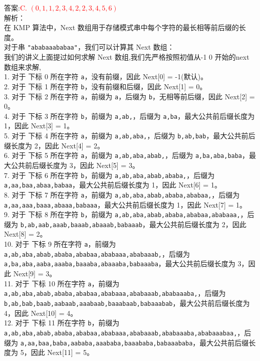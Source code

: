 \documentclass[lang=cn,newtx,10pt,scheme=chinese]{../../../elegantbook}
\begin{document}
\begin{enumerate}
    答案:\textcolor{red}{C. $(0, 1, 1, 2, 3, 4, 2, 2, 3,4,5,6)$}\\
    解析：\\
    在 KMP 算法中，Next 数组用于存储模式串中每个字符的最长相等前后缀的长度。\\
    对于串 \texttt{"ababaaababaa"}，我们可以计算其 Next 数组：\\
    我们的讲义上面提过如何求解 Next 数组,我们先严格按照初值从-1 0 开始的next 数组来求解,\\
    1. 对于 下标 0 所在字符 \texttt{a}，没有前缀，因此 Next[0] = -1(默认)。\\
    2. 对于 下标 1 所在字符 \texttt{b}，没有前缀和后缀，因此 Next[1] = 0。\\
    3. 对于 下标 2 所在字符 \texttt{a}，前缀为 \texttt{a}，后缀为 \texttt{b}，无相等前后缀，因此 Next[2] = 0。\\
    4. 对于 下标 3 所在字符 \texttt{b}，前缀为 \texttt{a,ab,}，后缀为 \texttt{a,ba}，最大公共前后缀长度为 1，因此 Next[3] = 1。\\
    5. 对于 下标 4 所在字符 \texttt{a}，前缀为 \texttt{a,ab,aba,}，后缀为 \texttt{b,ab,bab}，最大公共前后缀长度为 2，因此 Next[4] = 2。\\
    6. 对于 下标 5 所在字符 \texttt{a}，前缀为 \texttt{a,ab,aba,abab,}，后缀为 \texttt{a,ba,aba,baba}，最大公共前后缀长度为 3，因此 Next[5] = 3。\\
    7. 对于 下标 6 所在字符 \texttt{b}，前缀为 \texttt{a,ab,aba,abab,ababa,}，后缀为 \texttt{a,aa,baa,abaa,babaa}，最大公共前后缀长度为 1，因此 Next[6] = 1。\\
    8. 对于 下标 7 所在字符 \texttt{a}，前缀为 \texttt{a,ab,aba,abab,ababa,ababaa,}，后缀为 \texttt{a,aa,aaa,baaa,abaaa,babaaa}，最大公共前后缀长度为 1，因此 Next[7] = 1。\\
    9. 对于 下标 8 所在字符 \texttt{b}，前缀为 \texttt{a,ab,aba,abab,ababa,ababaa,ababaaa,}，后缀为 \texttt{b,ab,aab,aaab,baaab,abaaab,babaaab}，最大公共前后缀长度为 2，因此 Next[8] = 2。\\
    10. 对于 下标 9 所在字符 \texttt{a}，前缀为 \texttt{a,ab,aba,abab,ababa,ababaa,ababaaa,ababaaab,}，后缀为 \texttt{a,ba,aba,aaba,aaaba,baaaba,abaaaba,babaaaba}，最大公共前后缀长度为 3，因此 Next[9] = 3。\\
    11. 对于 下标 10 所在字符 \texttt{a}，前缀为 \texttt{a,ab,aba,abab,ababa,ababaa,ababaaa,ababaaab,ababaaaba,}，后缀为 \texttt{b,ab,bab,baab,aabaab,aaabaab,baaabaab,babaaabab}，最大公共前后缀长度为 4，因此 Next[10] = 4。\\
    12. 对于 下标 11 所在字符 \texttt{b}，前缀为 \texttt{a,ab,aba,abab,ababa,ababaa,ababaaa,ababaaab,ababaaaba,ababaaabaa,}，后缀为 \texttt{a,aa,baa,baba,aababa,aaababa,baaababa,babaaababa}，最大公共前后缀长度为 5，因此 Next[11] = 5。\\


\end{enumerate}
\end{document}
